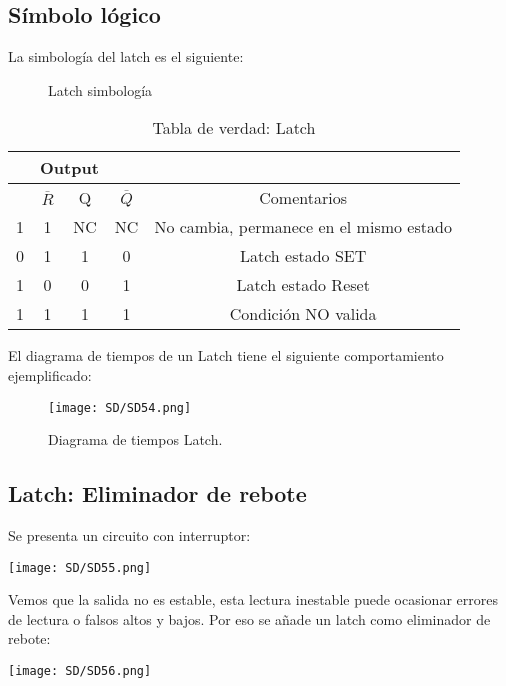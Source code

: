 \documentclass[11pt,fleqn]{book} %
\begin{document}
\subsection{Símbolo lógico}
La simbología del latch es el siguiente:
\begin{figure}
    \centering
    \qquad
    \caption{Latch simbología}
\end{figure}
\begin{table}[h]
\begin{center}
\begin{tabular}{|cc|cc|c|}
\hline
\rowcolor{ocre!70}
\multicolumn{2}{|c|}{Input}                           & \multicolumn{2}{c|}{Output}              &                                         \\ \hline
\rowcolor{ocre!50}
\multicolumn{1}{|c|}{$\overline{S}$} & $\overline{R}$ & \multicolumn{1}{c|}{Q}  & $\overline{Q}$ & Comentarios                             \\ \hline
\multicolumn{1}{|c|}{1}              & 1              & \multicolumn{1}{c|}{NC} & NC             & No cambia, permanece en el mismo estado \\ \hline
\multicolumn{1}{|c|}{0}              & 1              & \multicolumn{1}{c|}{1}  & 0              & Latch estado SET                        \\ \hline
\multicolumn{1}{|c|}{1}              & 0              & \multicolumn{1}{c|}{0}  & 1              & Latch estado Reset                      \\ \hline
\multicolumn{1}{|c|}{1}              & 1              & \multicolumn{1}{c|}{1}  & 1              & Condición NO valida                     \\ \hline
\end{tabular}
\caption{Tabla de verdad: Latch}
\end{center}
\end{table}
El diagrama de tiempos de un Latch tiene el siguiente comportamiento ejemplificado:
\begin{figure}[h!]
\centering
\texttt{[image: SD/SD54.png]}
\caption{Diagrama de tiempos Latch.}
\end{figure}
\subsection{Latch: Eliminador de rebote}
Se presenta un circuito con interruptor:\\
\begin{center}
\texttt{[image: SD/SD55.png]}
\end{center}
Vemos que la salida no es estable, esta lectura inestable puede ocasionar errores de lectura o falsos altos y bajos. Por eso se añade un latch como eliminador de rebote:\\
\begin{center}
\texttt{[image: SD/SD56.png]}
\end{center}
\end{document}

